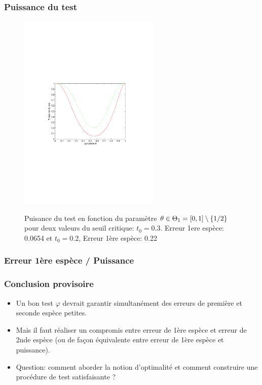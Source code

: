 \begin{frame}
\frametitle{Puissance du test}
\begin{figure}
  \centering
  \includegraphics[width=0.6\textwidth]{Puissance}\\
  \caption{Puisance du test en fonction du paramètre $\theta \in \Theta_1= \left[0,1\right]\setminus \{1/2\}$
  pour deux valeurs du seuil critique: $t_0=0.3$. Erreur 1ere espèce: 0.0654 et $t_0= 0.2$, Erreur 1ère espèce: 0.22 }
\end{figure}
\end{frame}

\begin{frame}
\frametitle{Erreur 1ère espèce / Puissance}


\end{frame}

\begin{frame}
\frametitle{Conclusion provisoire}
\begin{itemize}
\item Un  bon test  $\varphi$ devrait garantir \alert{ simultanément} des erreurs de première et seconde espèce \alert{petites}.
\item Mais il faut réaliser un compromis entre erreur de 1ère espèce et erreur de 2nde espèce (ou de façon équivalente entre erreur de 1ère espèce et puissance).
\item \alert{Question:} comment aborder la notion d'optimalité et comment construire une procédure de test satisfaisante ?
\end{itemize}
\end{frame}



